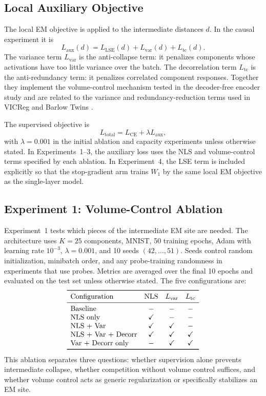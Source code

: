 \subsection{Local Auxiliary Objective}
The local EM objective is applied to the intermediate distances $d$. In the
causal experiment it is
\[
    L_{\mathrm{aux}}(d)
    =
    L_{\mathrm{LSE}}(d)
    + L_{\mathrm{var}}(d)
    + L_{\mathrm{tc}}(d).
\]
The variance term $L_{\mathrm{var}}$ is the anti-collapse term: it penalizes
components whose activations have too little variance over the batch. The
decorrelation term $L_{\mathrm{tc}}$ is the anti-redundancy term: it penalizes
correlated component responses. Together they implement the volume-control
mechanism tested in the decoder-free encoder study and are related to the
variance and redundancy-reduction terms used in VICReg and Barlow Twins
\citep{bardes2022vicreg,zbontar2021barlow}.

The supervised objective is
\[
    L_{\mathrm{total}}
    =
    L_{\mathrm{CE}}
    + \lambda L_{\mathrm{aux}},
\]
with $\lambda=0.001$ in the initial ablation and capacity experiments unless
otherwise stated. In Experiments~1--3, the auxiliary loss uses the NLS and
volume-control terms specified by each ablation. In Experiment~4, the LSE term
is included explicitly so that the stop-gradient arm trains $W_1$ by the same
local EM objective as the single-layer model.

\subsection{Experiment 1: Volume-Control Ablation}
Experiment~1 tests which pieces of the intermediate EM site are needed. The
architecture uses $K=25$ components, MNIST, 50 training epochs, Adam with
learning rate $10^{-3}$, $\lambda=0.001$, and 10 seeds $(42,\ldots,51)$. Seeds
control random initialization, minibatch order, and any probe-training
randomness in experiments that use probes. Metrics are averaged over the final
10 epochs and evaluated on the test set unless otherwise stated.
The five configurations are:
\[
\begin{array}{lccc}
\toprule
\text{Configuration} & \text{NLS} & L_{\mathrm{var}} & L_{\mathrm{tc}} \\
\midrule
\text{Baseline} & - & - & - \\
\text{NLS only} & \checkmark & - & - \\
\text{NLS + Var} & \checkmark & \checkmark & - \\
\text{NLS + Var + Decorr} & \checkmark & \checkmark & \checkmark \\
\text{Var + Decorr only} & - & \checkmark & \checkmark \\
\bottomrule
\end{array}
\]
This ablation separates three questions: whether supervision alone prevents
intermediate collapse, whether competition without volume control suffices,
and whether volume control acts as generic regularization or specifically
stabilizes an EM site.

